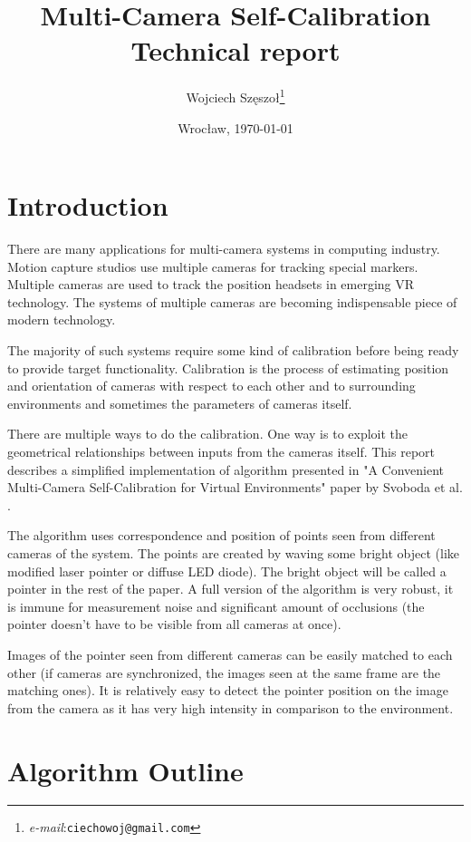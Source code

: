 \documentclass[12pt]{article}
\title{\textbf{Multi-Camera Self-Calibration}\\{\large Technical report}}
\author{Wojciech Szęszoł\thanks{\textit{e-mail}:\texttt{ciechowoj@gmail.com}}}
\date{Wrocław, \today}
\begin{document}
\maketitle

\thispagestyle{empty}
\newpage

\section{Introduction}

There are many applications for multi-camera systems in computing industry. Motion capture studios use multiple cameras for tracking special markers. Multiple
cameras are used to track the position headsets in emerging VR technology. The systems of
multiple cameras are becoming indispensable piece of modern technology.

The majority of such systems require some kind of calibration before being
ready to provide target functionality. Calibration is the process of
estimating position and orientation of cameras with respect to each other
and to surrounding environments and sometimes the parameters of cameras itself.

There are multiple ways to do the calibration. One way is to exploit the
geometrical relationships between inputs from the cameras itself. This report
describes a simplified implementation of algorithm presented in "A Convenient
Multi-Camera  Self-Calibration for Virtual Environments" paper by Svoboda et al.
\cite{svoboda05}.

The algorithm uses correspondence and position of points seen from different
cameras of the system. The points are created by waving some bright object
(like modified laser pointer or diffuse LED diode). The bright object will be
called a pointer in the rest of the paper. A full version of the algorithm is
very robust, it is immune for measurement noise and significant amount of
occlusions (the pointer doesn't have to be visible from all cameras at once).

Images of the pointer seen from different cameras can be easily matched to each
other (if cameras are synchronized, the images seen at the same frame are the
matching ones). It is relatively easy to detect the pointer position on the
image from the camera as it has very high intensity in comparison to the
environment.

\section{Algorithm Outline}
\end{document}
